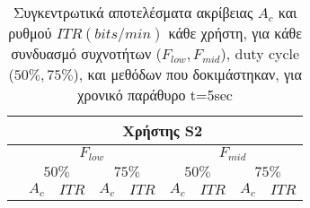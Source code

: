 \documentclass[11pt,a4paper,english,greek,twoside]{../Thesis}
\begin{document}
\begin{table}[H]
\begin{tabular}{ |p{4cm}||p{1cm}|p{1cm}|p{1cm}|p{1cm}|p{1cm}|p{1cm}|p{1cm}|p{1cm}|}
        \hline
        \multicolumn{1}{|c||}{}& \multicolumn{8}{c|}{Χρήστης S2}\\
        \hline
        & \multicolumn{4}{c|}{$F_{low}$} & \multicolumn{4}{c|}{$F_{mid}$} \\
        \hline
        & \multicolumn{2}{c|}{$50\%$} & \multicolumn{2}{c|}{$75\%$} &
        \multicolumn{2}{c|}{$50\%$} & \multicolumn{2}{c|}{$75\%$} \\
        \hline
        & \multicolumn{1}{c|}{$A_c$} & \multicolumn{1}{c|}{$ITR$} &
         \multicolumn{1}{c|}{$A_c$} & \multicolumn{1}{c|}{$ITR$} &
          \multicolumn{1}{c|}{$A_c$} & \multicolumn{1}{c|}{$ITR$} &
           \multicolumn{1}{c|}{$A_c$} & \multicolumn{1}{c|}{$ITR$} \\
        \hline
        \hline
    \end{tabular}
    \caption{Συγκεντρωτικά αποτελέσματα ακρίβειας $A_c$ και ρυθμού $ITR (bits/min)$ κάθε χρήστη, για κάθε συνδυασμό συχνοτήτων ($F_{low}, F_{mid}$), duty cycle ($50\%, 75\%$), και μεθόδων που δοκιμάστηκαν, για χρονικό παράθυρο t=5sec}
    \label{tab:full_results}
\end{table}
\end{document}
